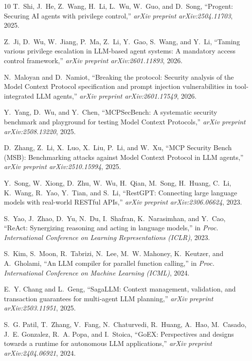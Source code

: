 \documentclass[conference,10pt]{IEEEtran}
\begin{document}
\begin{thebibliography}{10}
T.~Shi, J.~He, Z.~Wang, H.~Li, L.~Wu, W.~Guo, and D.~Song, ``{Progent}: Securing {AI} agents with privilege control,'' \emph{arXiv preprint arXiv:2504.11703}, 2025.

Z.~Ji, D.~Wu, W.~Jiang, P.~Ma, Z.~Li, Y.~Gao, S.~Wang, and Y.~Li, ``Taming various privilege escalation in {LLM}-based agent systems: A mandatory access control framework,'' \emph{arXiv preprint arXiv:2601.11893}, 2026.

N.~Maloyan and D.~Namiot, ``Breaking the protocol: Security analysis of the Model Context Protocol specification and prompt injection vulnerabilities in tool-integrated {LLM} agents,'' \emph{arXiv preprint arXiv:2601.17549}, 2026.

Y.~Yang, D.~Wu, and Y.~Chen, ``{MCPSecBench}: A systematic security benchmark and playground for testing Model Context Protocols,'' \emph{arXiv preprint arXiv:2508.13220}, 2025.

D.~Zhang, Z.~Li, X.~Luo, X.~Liu, P.~Li, and W.~Xu, ``{MCP} Security Bench ({MSB}): Benchmarking attacks against Model Context Protocol in {LLM} agents,'' \emph{arXiv preprint arXiv:2510.15994}, 2025.

Y.~Song, W.~Xiong, D.~Zhu, W.~Wu, H.~Qian, M.~Song, H.~Huang, C.~Li, K.~Wang, R.~Yao, Y.~Tian, and S.~Li, ``{RestGPT}: Connecting large language models with real-world {RESTful} {APIs},'' \emph{arXiv preprint arXiv:2306.06624}, 2023.

S.~Yao, J.~Zhao, D.~Yu, N.~Du, I.~Shafran, K.~Narasimhan, and Y.~Cao, ``{ReAct}: Synergizing reasoning and acting in language models,'' in \emph{Proc. International Conference on Learning Representations (ICLR)}, 2023.

S.~Kim, S.~Moon, R.~Tabrizi, N.~Lee, M.~W. Mahoney, K.~Keutzer, and A.~Gholami, ``An {LLM} compiler for parallel function calling,'' in \emph{Proc. International Conference on Machine Learning (ICML)}, 2024.

E.~Y. Chang and L.~Geng, ``{SagaLLM}: Context management, validation, and transaction guarantees for multi-agent {LLM} planning,'' \emph{arXiv preprint arXiv:2503.11951}, 2025.

S.~G. Patil, T.~Zhang, V.~Fang, N.~Chaturvedi, R.~Huang, A.~Hao, M.~Casado, J.~E. Gonzalez, R.~A. Popa, and I.~Stoica, ``{GoEX}: Perspectives and designs towards a runtime for autonomous {LLM} applications,'' \emph{arXiv preprint arXiv:2404.06921}, 2024.


\end{thebibliography}
\end{document}
